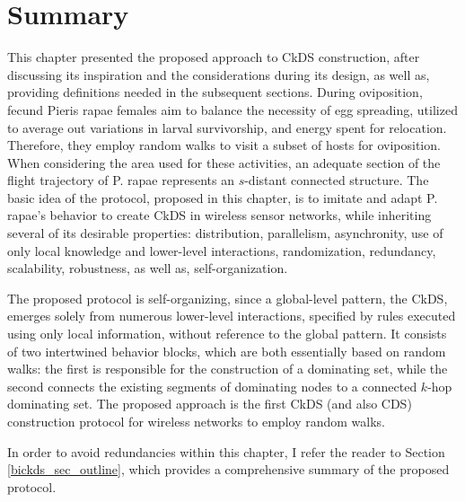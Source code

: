 \section{Summary}

This chapter presented the proposed approach to CkDS construction, after discussing its inspiration and the considerations during its design, as well as, providing definitions needed in the subsequent sections. 
During oviposition, fecund Pieris rapae females aim to balance the necessity of egg spreading, utilized to average out variations in larval survivorship, and energy spent for relocation. Therefore, they employ random walks to visit a subset of hosts for oviposition. When considering the area used for these activities, an adequate section of the flight trajectory of P. rapae represents an $s$-distant connected structure. The basic idea of the protocol, proposed in this chapter, is to imitate and adapt P. rapae's behavior to create CkDS in wireless sensor networks, while inheriting several of its desirable properties: distribution, parallelism, asynchronity, use of only local knowledge and lower-level interactions, randomization, redundancy, scalability, robustness, as well as, self-organization. 

The proposed protocol is self-organizing,
since a global-level pattern, the CkDS, emerges
solely from numerous lower-level interactions, specified by
rules executed using only local information, without reference
to the global pattern. It consists of two intertwined
behavior blocks, which are both essentially based on random
walks: the first is responsible for the construction of a
dominating set, while the second connects the existing
segments of dominating nodes to a connected $k$-hop dominating
set. The proposed approach is the first CkDS (and also CDS) construction protocol for wireless networks to employ random walks. 

In order to avoid redundancies within this chapter, I refer the reader to Section \ref{bickds_sec_outline}, which provides a comprehensive summary of the proposed protocol. 

